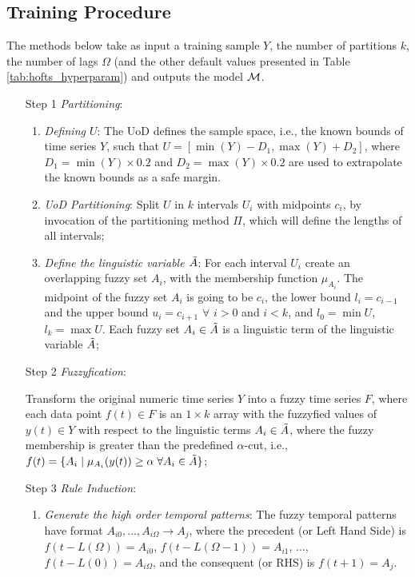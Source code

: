 %
\subsection{Training Procedure}
\label{sec:fts_training_procedure}

The methods below take as input a training sample $Y$, the number of partitions $k$, the number of lags $\Omega$ (and the other default values presented in Table \ref{tab:hofts_hyperparam}) and outputs the model $\mathcal{M}$.

\begin{enumerate}
\item[Step 1] \textit{Partitioning}:
\begin{enumerate}
\item \textit{Defining $U$}: The UoD defines the sample space, i.e., the known bounds of time series $Y$, such that $U = [\min(Y)-D_1, \max(Y)+D_2]$, where $D_1 = \min(Y)\times 0.2$ and $D_2 = \max(Y)\times 0.2$ are used to extrapolate the known bounds as a safe margin. 

\item \textit{UoD Partitioning}: Split $U$ in $k$ intervals $U_i$ with midpoints $c_i$, by invocation of the partitioning method $\Pi$, which will define the lengths of all intervals;

\item \textit{Define the linguistic variable $\Tilde{A}$}: For each interval $U_i$ create an overlapping fuzzy set $A_i$, with the membership function $\mu_{A_i}$. The midpoint of the fuzzy set $A_i$ is going to be $c_i$, the lower bound $l_i = c_{i-1}$ and the upper bound $u_i = c_{i+1}$ $\forall$ $i >0$ and $i < k$, and $l_0 = \min U$, $l_k = \max U$. Each fuzzy set $A_i \in \Tilde{A}$ is a linguistic term of the linguistic variable $\Tilde{A}$;
\end{enumerate}

\item[Step 2] \textit{Fuzzyfication}: 

Transform the original numeric time series $Y$ into a fuzzy time series $F$, where each data point $f(t) \in F$ is an $1\times k$ array with the fuzzyfied values of $y(t) \in Y$ with respect to the linguistic terms $A_i \in \Tilde{A}$, where the fuzzy membership is greater than the predefined $\alpha$-cut, i.e., $f(t) = \{A_i\; |\; \mu_{A_i}(y(t)) \geq \alpha\;\forall A_i \in \Tilde{A}\}$;

\item[Step 3] \textit{Rule Induction}: 
\begin{enumerate}
\item \textit{Generate the high order temporal patterns}: The fuzzy temporal patterns have format $A_{i0},...,A_{i\Omega} \rightarrow A_j$, where the precedent (or Left Hand Side) is $f(t - L(\Omega)) = A_{i0}$, $f(t - L(\Omega-1)) = A_{i1}$, ..., $f(t - L(0)) = A_{i\Omega}$, and the consequent (or RHS) is $f(t+1) = A_j$.


\end{enumerate}
\end{enumerate}

